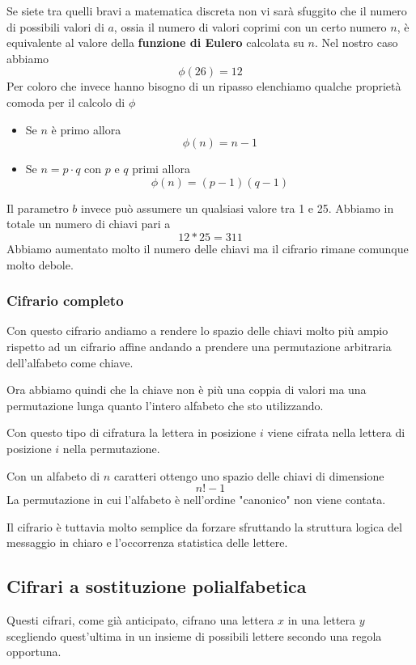 Se siete tra quelli bravi a matematica discreta non vi sar\`a sfuggito che il numero di possibili valori di $a$, ossia il
numero di valori coprimi con un certo numero $n$, \`e equivalente al valore della \textbf{funzione di Eulero} calcolata
su $n$. Nel nostro caso abbiamo
\[ \phi(26) = 12 \]
Per coloro che invece hanno bisogno di un ripasso elenchiamo qualche propriet\`a comoda per il calcolo di $\phi$
\begin{itemize}
	\item Se $n$ \`e primo allora
	      \[ \phi(n) = n - 1 \]
	\item Se $n = p \cdot q$ con $p$ e $q$ primi allora
	      \[ \phi(n) = (p - 1)(q - 1) \]
\end{itemize}
Il parametro $b$ invece pu\`o assumere un qualsiasi valore tra 1 e 25. Abbiamo in totale un numero di chiavi pari a
\[ 12 * 25 = 311 \]
Abbiamo aumentato molto il numero delle chiavi ma il cifrario rimane comunque molto debole.

\subsubsection{Cifrario completo}
Con questo cifrario andiamo a rendere lo spazio delle chiavi molto pi\`u ampio rispetto ad un cifrario affine andando a
prendere una permutazione arbitraria dell'alfabeto come chiave.

Ora abbiamo quindi che la chiave non \`e pi\`u una coppia di valori ma una permutazione lunga quanto l'intero alfabeto che
sto utilizzando.

Con questo tipo di cifratura la lettera in posizione $i$ viene cifrata nella lettera di posizione $i$ nella permutazione.

Con un alfabeto di $n$ caratteri ottengo uno spazio delle chiavi di dimensione
\[ n! - 1 \]
La permutazione in cui l'alfabeto \`e nell'ordine "canonico" non viene contata.

Il cifrario \`e tuttavia molto semplice da forzare sfruttando la struttura logica del messaggio in chiaro e l'occorrenza
statistica delle lettere.

\subsection{Cifrari a sostituzione polialfabetica}
Questi cifrari, come gi\`a anticipato, cifrano una lettera $x$ in una lettera $y$ scegliendo quest'ultima in un insieme di
possibili lettere secondo una regola opportuna.

